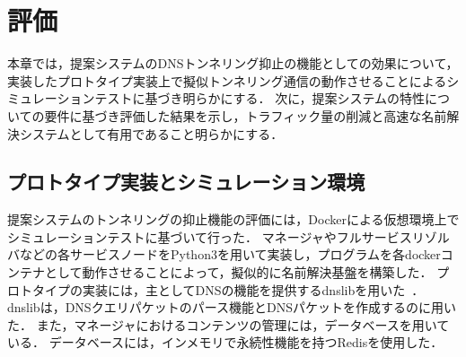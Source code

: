\section{評価}
\label{sec:evaluation}
本章では，提案システムのDNSトンネリング抑止の機能としての効果について，実装したプロトタイプ実装上で擬似トンネリング通信の動作させることによるシミュレーションテストに基づき明らかにする．
次に，提案システムの特性についての要件に基づき評価した結果を示し，トラフィック量の削減と高速な名前解決システムとして有用であること明らかにする．


%

\subsection{プロトタイプ実装とシミュレーション環境}
\label{sec:simulation}
提案システムのトンネリングの抑止機能の評価には，Dockerによる仮想環境上でシミュレーションテストに基づいて行った．
マネージャやフルサービスリゾルバなどの各サービスノードをPython3を用いて実装し，プログラムを各dockerコンテナとして動作させることによって，擬似的に名前解決基盤を構築した．
プロトタイプの実装には，主としてDNSの機能を提供するdnslibを用いた~\cite{dnslib}．
dnslibは，DNSクエリパケットのパース機能とDNSパケットを作成するのに用いた．
また，マネージャにおけるコンテンツの管理には，データベースを用いている．
データベースには，インメモリで永続性機能を持つRedisを使用した．


